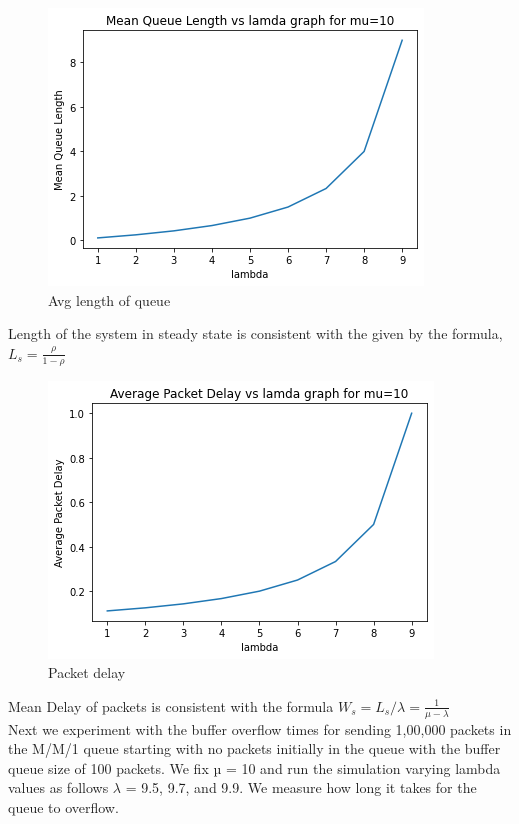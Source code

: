 \begin{figure}[H]
    \centering
    \includegraphics{length_vs_lamda.png}
    \caption{Avg length of queue}
    \label{fig:lenvslambda}
\end{figure}

Length of the system in steady state is consistent with the given by the formula, $L_s=\frac{\rho}{1-\rho}$
\begin{figure}[H]
    \centering
    \includegraphics{packet_delay_lamda.png}
    \caption{Packet delay}
    \label{fig:delay}
\end{figure}

Mean Delay of packets is consistent with the formula $W_s = L_s/\lambda=\frac{1}{\mu-\lambda}$
\\

Next we experiment with the buffer overflow times for sending 1,00,000 packets in the M/M/1 queue starting with no packets initially in the queue with the buffer queue size of 100 packets. We fix µ = 10 and run the simulation varying lambda values as follows $\lambda$ = 9.5, 9.7, and 9.9. We measure how long it takes for the queue to overflow.


